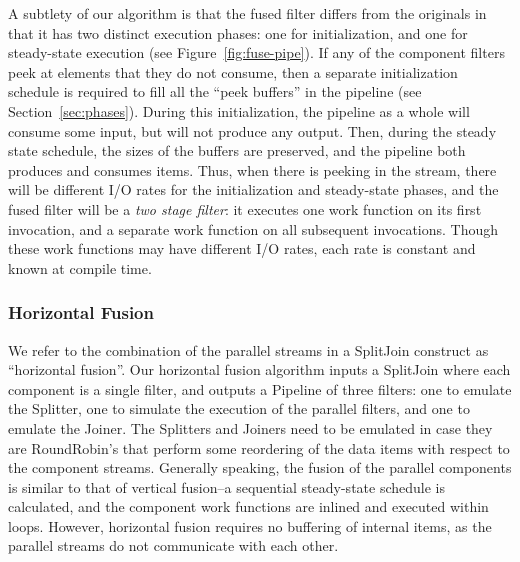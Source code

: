 A subtlety of our algorithm is that the fused filter differs from the
originals in that it has two distinct execution phases: one for
initialization, and one for steady-state execution (see
Figure~\ref{fig:fuse-pipe}).  If any of the component filters peek at
elements that they do not consume, then a separate initialization
schedule is required to fill all the ``peek buffers'' in the pipeline
(see Section~\ref{sec:phases}).  During this initialization, the
pipeline as a whole will consume some input, but will not produce any
output.  Then, during the steady state schedule, the sizes of the
buffers are preserved, and the pipeline both produces and consumes
items.  Thus, when there is peeking in the stream, there will be
different I/O rates for the initialization and steady-state phases,
and the fused filter will be a {\it two stage filter}: it executes one
work function on its first invocation, and a separate work function on
all subsequent invocations.  Though these work functions may have
different I/O rates, each rate is constant and known at compile time.

\subsubsection{Horizontal Fusion}

We refer to the combination of the parallel streams in a SplitJoin
construct as ``horizontal fusion''.  Our horizontal fusion algorithm
inputs a SplitJoin where each component is a single filter, and
outputs a Pipeline of three filters: one to emulate the Splitter, one
to simulate the execution of the parallel filters, and one to emulate
the Joiner.  The Splitters and Joiners need to be emulated in case
they are RoundRobin's that perform some reordering of the data items
with respect to the component streams.  Generally speaking, the fusion
of the parallel components is similar to that of vertical fusion--a
sequential steady-state schedule is calculated, and the component work
functions are inlined and executed within loops.  However, horizontal
fusion requires no buffering of internal items, as the parallel
streams do not communicate with each other.

